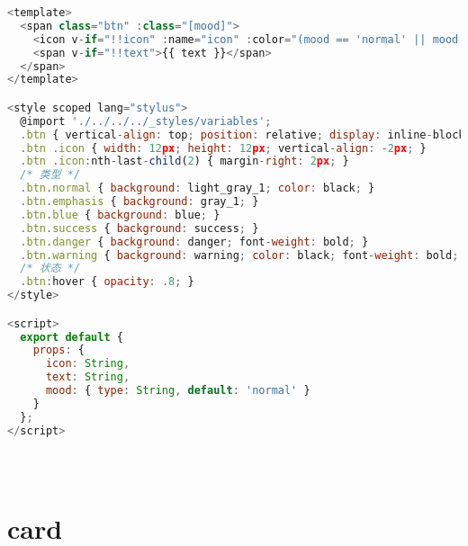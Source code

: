 \begin{lstlisting}[language=JavaScript]
<template>
  <span class="btn" :class="[mood]">
    <icon v-if="!!icon" :name="icon" :color="(mood == 'normal' || mood == 'warning') ? '#333' : '#fff'"></icon>
    <span v-if="!!text">{{ text }}</span>
  </span>
</template>

<style scoped lang="stylus">
  @import './../../../_styles/variables';
  .btn { vertical-align: top; position: relative; display: inline-block; line-height: row_height_1; height: row_height_1; background: gray_1; padding: 0 8px; font-size: 12px; color: #fff; border-radius: 3px; transition: all .1s; cursor: pointer; }
  .btn .icon { width: 12px; height: 12px; vertical-align: -2px; }
  .btn .icon:nth-last-child(2) { margin-right: 2px; }
  /* 类型 */
  .btn.normal { background: light_gray_1; color: black; }
  .btn.emphasis { background: gray_1; }
  .btn.blue { background: blue; }
  .btn.success { background: success; }
  .btn.danger { background: danger; font-weight: bold; }
  .btn.warning { background: warning; color: black; font-weight: bold; }
  /* 状态 */
  .btn:hover { opacity: .8; }
</style>

<script>
  export default {
    props: {
      icon: String,
      text: String,
      mood: { type: String, default: 'normal' }
    }
  };
</script>
\end{lstlisting}





\begin{lstlisting}[language=JavaScript]

\end{lstlisting}






\begin{lstlisting}[language=JavaScript]

\end{lstlisting}






\begin{lstlisting}[language=JavaScript]

\end{lstlisting}




\chapter{card}

